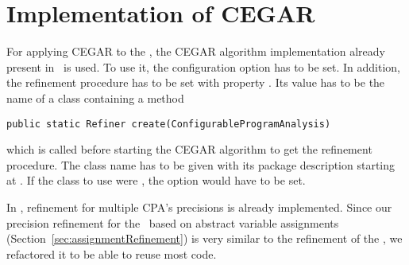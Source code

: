 \section{Implementation of CEGAR}
For applying CEGAR to the \symbolicExecutionCPA, the CEGAR algorithm implementation already present in \cpaChecker\ is used.
To use it, the configuration option  has to be set.
In addition, the refinement procedure has to be set with property .
Its value has to be the name of a class containing a method
\begin{lstlisting}
public static Refiner create(ConfigurableProgramAnalysis)
\end{lstlisting}
which is called before starting the CEGAR algorithm to get the refinement procedure.
The class name has to be given with its package description starting at
.
If the class to use were
,
the option  would have to be set.

In \cpaChecker, refinement for multiple CPA's precisions is already implemented.
Since our precision refinement for the \symbolicExecutionCPA\ based on abstract variable assignments (Section~\ref{sec:assignmentRefinement}) is very similar to the refinement of the , we refactored it to be able to reuse most code.



